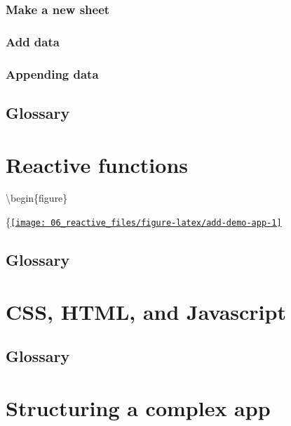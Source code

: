 \documentclass[
]{book}
\begin{document}
\hypertarget{make-a-new-sheet}{%
\subsection{Make a new sheet}\label{make-a-new-sheet}}

\hypertarget{add-data}{%
\subsection{Add data}\label{add-data}}

\hypertarget{appending-data}{%
\subsection{Appending data}\label{appending-data}}

\hypertarget{glossary-data}{%
\section{Glossary}\label{glossary-data}}

\hypertarget{reactives}{%
\chapter{Reactive functions}\label{reactives}}

\textbackslash begin\{figure\}

\{\centering \href{https://shiny.psy.gla.ac.uk/debruine/add_demo/}{\texttt{[image: 06\_reactive\_files/figure-latex/add-demo-app-1]} }

\hypertarget{glossary-reactives}{%
\section{Glossary}\label{glossary-reactives}}

\hypertarget{web}{%
\chapter{CSS, HTML, and Javascript}\label{web}}

\hypertarget{glossary-web}{%
\section{Glossary}\label{glossary-web}}

\hypertarget{structure}{%
\chapter{Structuring a complex app}\label{structure}}
\end{document}

